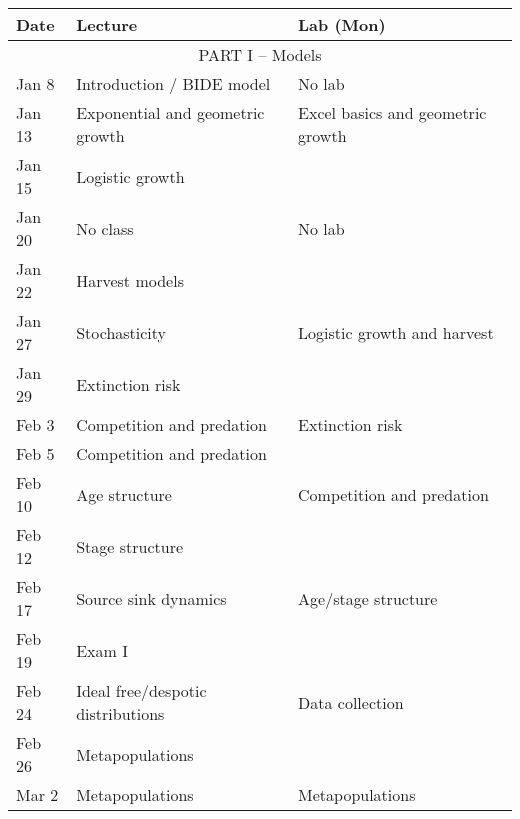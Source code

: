 \documentclass[12pt]{article}
\begin{document}
\begin{center}
\begin{tabular}[c]{lll}
\hline \hline
{\bf Date} & {\bf Lecture}                      & {\bf Lab (Mon)}               \\
\hline
           \multicolumn{3}{c}{PART I -- Models}                                     \\
\hline
Jan 8      & Introduction / BIDE model          & No lab                            \\
\hline
Jan 13     & Exponential and geometric growth   & Excel basics and geometric growth \\
Jan 15     & Logistic growth                    &                                   \\
\hline
Jan 20     & No class                           & No lab
        \\
Jan 22     & Harvest models                     &                                   \\
\hline
Jan 27     & Stochasticity                      & Logistic growth and harvest       \\
Jan 29     & Extinction risk                    &                                   \\
\hline
Feb 3      & Competition and predation          & Extinction risk                   \\
Feb 5      & Competition and predation          &                                   \\
\hline
Feb 10     & Age structure                      & Competition and predation         \\
Feb 12     & Stage structure                    &                                   \\
\hline
Feb 17     & Source sink dynamics               & Age/stage structure               \\
Feb 19     & Exam I                             &                                   \\
\hline
Feb 24     & Ideal free/despotic distributions  & Data collection                   \\
Feb 26     & Metapopulations                    &                                   \\
\hline
Mar 2      & Metapopulations                    & Metapopulations                   \\

\end{tabular}
\end{center}
\end{document}
